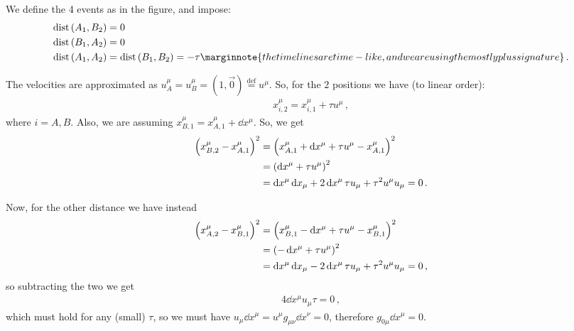 \documentclass[main.tex]{subfiles}
\begin{document}
We define the 4 events as in the figure, and impose: 
%
\begin{align}
\operatorname{dist} \qty(A_1, B_2 ) &= 0 \\ 
\operatorname{dist} \qty(B_1, A_2  ) &= 0 \\ 
\operatorname{dist} \qty(A_1, A_2  ) &=  
\operatorname{dist} \qty(B_1, B_2  ) = - \tau 
\marginnote{the timelines are time-like, and we are using the mostly plus signature}
\,.
\end{align}

The velocities are approximated as \(u^{\mu }_A = u^{\mu }_{B} = (1, \vec{0}) \overset{\text{def}}{=} u^{\mu }\). So, for the \(2\) positions we have (to linear order): 
%
\begin{align}
x^{\mu }_{i, 2} = x^{\mu }_{i, 1} + \tau u^{\mu }
\,,
\end{align}
%
where \(i = A, B\). 
Also, we are assuming \(x^{\mu }_{B, 1} = x^{\mu }_{A, 1} + \dd{x^{\mu }}\). So, we get 
%
\begin{align}
\qty(x^{\mu }_{B, 2} - x^{\mu }_{A, 1})^2 &= \qty(x^{\mu }_{A, 1} + \dd{x^{\mu }} + \tau u^{\mu } - x^{\mu }_{A, 1})^2  \\
&= \qty(\dd{x^{\mu }} + \tau u^{\mu })^2  \\
&= \dd{x^{\mu }} \dd{x_{\mu }} + 2 \dd{x^{\mu }} \tau u_{\mu } + \tau^2 u^{\mu } u_{\mu } =0
\,.
\end{align}

Now, for the other distance we have instead 
%
\begin{align}
\qty(x^{\mu }_{A, 2} - x^{\mu }_{B, 1})^2 &=
\qty(x^{\mu }_{B, 1} - \dd{x^{\mu }} + \tau u^{\mu } - x^{\mu }_{B, 1})^2  \\
&= \qty(-\dd{x^{\mu }} + \tau u^{\mu })^2  \\
&= \dd{x^{\mu }} \dd{x_{\mu }} - 2 \dd{x^{\mu }} \tau u_{\mu } + \tau^2 u^{\mu } u_{\mu } =0
\,,
\end{align}
%
so subtracting the two we get 
%
\begin{align}
4 \dd{x^{\mu }} u_{\mu } \tau = 0
\,,
\end{align}
%
which must hold for any (small) \(\tau \), so we must have \(u_{\mu }\dd{x^{\mu }}=u^{\mu } g_{\mu \nu } \dd{x^{\nu }} =  0\), therefore \(g_{0 \mu } \dd{x^{\mu }}= 0\).
\end{document}
